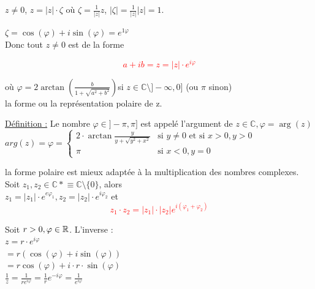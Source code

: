 \documentclass[12pt,a4paper]{article}
\begin{document}
{$z \neq 0$, $z = |z|\cdot\zeta$ où $\zeta = \frac{1}{|z|}z$, $|\zeta| = \frac{1}{|z|}|z| = 1$.

$\zeta = \cos(\varphi) + i\sin(\varphi) = e^{1\varphi}$\\
Donc tout $z \neq 0$ est de la forme 

\textcolor{red}{\begin{equation}
a+ib = z = |z| \cdot e^{i\varphi}
\end{equation}}

où $\varphi =2 \arctan(\frac{b}{1+\sqrt{a^2 + b^2}})$si $z \in \mathbb{C}\setminus ]-\infty, 0]$ (ou $\pi$ sinon)\\
la forme ou la représentation polaire de z.
\begin{boite}
\underline{Définition :} Le nombre $\varphi \in ]-\pi, \pi]$ est appelé l'argument de $z \in \mathbb{C}, \varphi = \arg(z)$\\
$arg(z)= \varphi= \left\{
    \begin{array}{lr}
        2\cdot \arctan\frac{y}{y+\sqrt{y^2+x^2}} & \mbox{si } y \neq 0 \mbox{ et si } x>0, y>0\\
        \pi & \mbox{si } x<0, y = 0
    \end{array}
\right.
$
\end{boite}

la forme polaire est mieux adaptée à la multiplication des nombres complexes. Soit $z_1, z_2 \in \mathbb{C*} \equiv \mathbb{C} \setminus \{0\}$, alors\\
$z_1 = |z_1|\cdot e^{e\varphi_1}, z_2 = |z_2|\cdot e^{i\varphi_2}$
et 
\textcolor{red}{\begin{equation}
z_1\cdot z_2 = |z_1|\cdot|z_2| e^{i(\varphi_1 + \varphi_2)}
\end{equation}}

Soit $r > 0, \varphi \in \mathbb{R}$. L'inverse :\\
$z = r\cdot e^{i\varphi}$\\
$= r (\cos(\varphi) + i\sin(\varphi))$\\
$= r\cos(\varphi) + i\cdot r \cdot \sin(\varphi)$\\

$\frac{1}{z} = \frac{1}{r e^{i\varphi}} = \frac{1}{r} e^{-i\varphi} = \frac{1}{e^{i\varphi}}$
}
\end{document}
